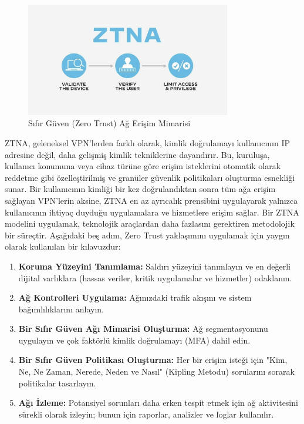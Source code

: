 \begin{figure}[H]
    \centering
    \includegraphics[width=0.8\textwidth]{img/ZTNA.png}
    \caption{Sıfır Güven (Zero Trust) Ağ Erişim Mimarisi}
    \label{fig:ztna}
\end{figure}
ZTNA, geleneksel VPN'lerden farklı olarak, kimlik doğrulamayı kullanıcının IP adresine değil, daha gelişmiş kimlik tekniklerine dayandırır. Bu, kuruluşa, kullanıcı konumuna veya cihaz türüne göre erişim isteklerini otomatik olarak reddetme gibi özelleştirilmiş ve granüler güvenlik politikaları oluşturma esnekliği sunar. Bir kullanıcının kimliği bir kez doğrulandıktan sonra tüm ağa erişim sağlayan VPN'lerin aksine, ZTNA en az ayrıcalık prensibini uygulayarak yalnızca kullanıcının ihtiyaç duyduğu uygulamalara ve hizmetlere erişim sağlar.
Bir ZTNA modelini uygulamak, teknolojik araçlardan daha fazlasını gerektiren metodolojik bir süreçtir. Aşağıdaki beş adım, Zero Trust yaklaşımını uygulamak için yaygın olarak kullanılan bir kılavuzdur:

\begin{enumerate}
\item \textbf{Koruma Yüzeyini Tanımlama:} Saldırı yüzeyini tanımlayın ve en değerli dijital varlıklara (hassas veriler, kritik uygulamalar ve hizmetler) odaklanın.
\item \textbf{Ağ Kontrolleri Uygulama:} Ağınızdaki trafik akışını ve sistem bağımlılıklarını anlayın.
\item \textbf{Bir Sıfır Güven Ağı Mimarisi Oluşturma:} Ağ segmentasyonunu uygulayın ve çok faktörlü kimlik doğrulamayı (MFA) dahil edin.
\item \textbf{Bir Sıfır Güven Politikası Oluşturma:} Her bir erişim isteği için "Kim, Ne, Ne Zaman, Nerede, Neden ve Nasıl" (Kipling Metodu) sorularını sorarak politikalar tasarlayın.
\item \textbf{Ağı İzleme:} Potansiyel sorunları daha erken tespit etmek için ağ aktivitesini sürekli olarak izleyin; bunun için raporlar, analizler ve loglar kullanılır.
\end{enumerate}

